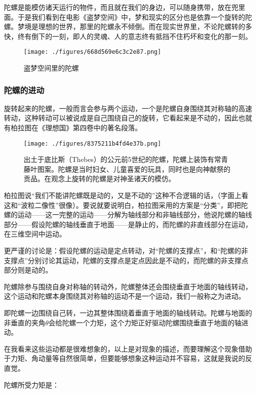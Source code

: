 陀螺是能模仿诸天运行的物件，而且就在我们的身边，可以随身携带，放在兜里面。于是我们看到在电影《盗梦空间》中，梦和现实的区分也是依靠一个旋转的陀螺。梦境是理想的世界，那里的陀螺永不倾倒。而在现实世界里，不论陀螺转的多快，终有倒下的一刻，即人的灵魂、人的意志终有抵挡不住朽坏和变化的那一刻。
\begin{figure}[ht]
\centering
\texttt{[image: ./figures/668d569e6c3c2e87.png]}
\caption{盗梦空间里的陀螺} \label{fig_QMPre2_5}
\end{figure}

\subsubsection{陀螺的进动}


旋转起来的陀螺，一般而言会参与两个运动，一个是陀螺自身围绕其对称轴的高速转动，这种转动可以被说成是自己围绕自己的旋转，它看起来是不动的，因此也就有柏拉图在《理想国》第四卷中的著名段落。

\begin{figure}[ht]
\centering
\texttt{[image: ./figures/8375211b4fd4e37b.png]}
\caption{出土于底比斯（Thebes）的公元前5世纪的陀螺，陀螺上装饰有常青藤叶图案。陀螺是当时妇女、儿童喜爱的玩具，同时也是向神献祭的贡品。在观念上旋转的陀螺是对神圣诸天的模仿。} \label{fig_QMPre2_6}
\end{figure}

柏拉图说“我们不能讲陀螺既是动的，又是不动的”这种不合逻辑的话，（字面上看这和“波粒二像性”很像）。要说就要说明白，柏拉图采用的方案是“分类”，即把陀螺的运动——这一完整的运动——分解为轴线部分和非轴线部分，他说陀螺的轴线部分——假设陀螺的轴线垂直于地面——是静止的，而陀螺的非直线部分在运动，在三维空间中运动。

更严谨的讨论是：假设陀螺的运动是定点转动，对“陀螺的支撑点”，和“陀螺的非支撑点”分别讨论其运动，陀螺的支撑点是定点因此是不动的，而陀螺的非支撑点部分则是动的。

陀螺除参与围绕自身对称轴的转动外，陀螺整体还会围绕垂直于地面的轴线转动，这个运动和陀螺本身围绕其对称轴的运动不是一个运动，我们一般称之为进动。

即陀螺一边围绕自己转，一边其整体围绕着垂直于地面的轴线转动。陀螺与地面的非垂直的夹角$\theta$会给陀螺一个力矩，这个力矩正好驱动陀螺围绕垂直于地面的轴进动。

在我看来这些运动都是很难想象的，以上是对现象的描述，而要理解这个现象借助于力矩、角动量等自然很简单，但要能够想象这种运动并不容易，这就是我说的反直觉。

陀螺所受力矩是：

